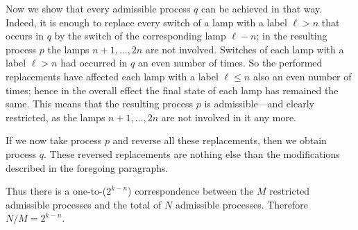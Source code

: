 \documentclass[11pt]{article}
\begin{document}
Now we show that every admissible process $q$ can be achieved in that way. Indeed, it is enough to replace every switch of a lamp with a label $\ell > n$ that occurs in $q$ by the switch of the corresponding lamp $\ell-n$; in the resulting process $p$ the lamps $n+1, \dots, 2n$ are not involved. Switches of each lamp with a label $\ell > n$ had occurred in $q$ an even number of times. So the performed replacements have affected each lamp with a label $\ell \le n$ also an even number of times; hence in the overall effect the final state of each lamp has remained the same. This means that the resulting process $p$ is admissible---and clearly restricted, as the lamps $n+1, \dots, 2n$ are not involved in it any more.

If we now take process $p$ and reverse all these replacements, then we obtain process $q$. These reversed replacements are nothing else than the modifications described in the foregoing paragraphs.

Thus there is a one-to-($2^{k-n}$) correspondence between the $M$ restricted admissible processes and the total of $N$ admissible processes. Therefore $N/M = 2^{k-n}$.
\end{document}
